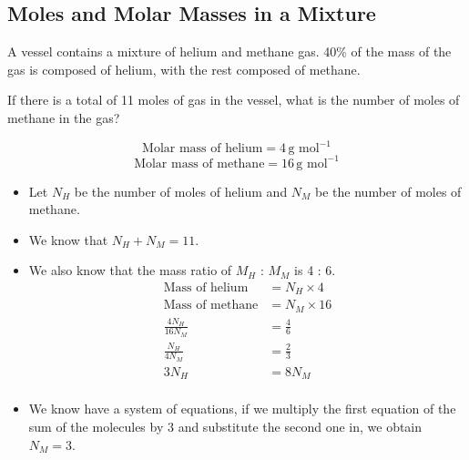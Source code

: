 \documentclass[a4paper,12pt]{article}
\begin{document}
\pagebreak

\subsection{Moles and Molar Masses in a Mixture}

A vessel contains a mixture of helium and methane gas. 40\% of the mass of the gas is composed of helium, with the rest composed of methane.

If there is a total of 11 moles of gas in the vessel, what is the number of moles of methane in the gas?

\[
  \text{Molar mass of helium} = 4 \, \text{g mol}^{-1}
\]
\[
  \text{Molar mass of methane} = 16 \, \text{g mol}^{-1}
\]

\begin{itemize}
  \item Let $N_H$ be the number of moles of helium and $N_M$ be the number of moles of methane.
  \item We know that $N_H + N_M = 11$.
  \item We also know that the mass ratio of $M_H$ : $M_M$ is 4 : 6.
        \begin{align*}
          \text{Mass of helium}  & = N_H \times 4  \\
          \text{Mass of methane} & = N_M \times 16 \\
          \frac{4N_H}{16N_M}     & = \frac{4}{6}   \\
          \frac{N_H}{4N_M}       & = \frac{2}{3}   \\
          3N_H                   & = 8N_M          \\
        \end{align*}
  \item We know have a system of equations, if we multiply the first equation of the sum of the molecules by 3 and substitute the second one in, we obtain $N_M = 3$.
\end{itemize}
\end{document}
